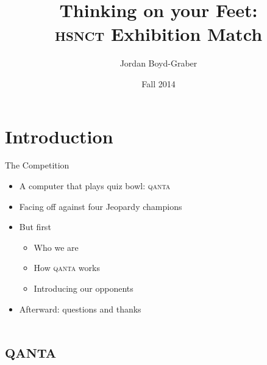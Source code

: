 \documentclass[compress]{beamer}
\title[Thinking on Your Feet]{Thinking on your Feet: \\ \textsc{hsnct} Exhibition Match}
\author{ Jordan Boyd-Graber}
\date{Fall 2014}
\institute[Boulder] %
{University of Colorado Boulder}
\begin{document}
\frame{
\titlepage
\tiny
}

\section{Introduction}

\begin{frame}{The Competition}

\begin{itemize}
	\item A computer that plays quiz bowl: \textsc{qanta}
	\item Facing off against four Jeopardy champions
	\pause
	\item But first
	\begin{itemize}
		\item Who we are
		\item How \textsc{qanta} works
		\item Introducing our opponents
	\end{itemize}
	\pause
	\item Afterward: questions and thanks
\end{itemize}

\end{frame}

\section{\textsc{qanta}}
\end{document}
